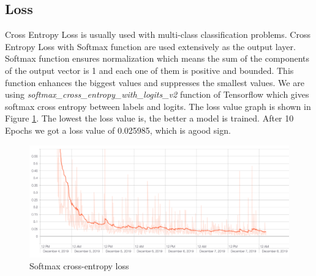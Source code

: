 \subsection{Loss}
Cross Entropy Loss is usually used with multi-class classification problems. Cross Entropy Loss with Softmax function are used extensively as the output layer. Softmax function ensures normalization which means the sum of the components of the output vector is 1 and each one of them is positive and bounded. This function enhances the biggest values and suppresses the smallest values. We are using \textit{softmax\_cross\_entropy\_with\_logits\_v2} function of Tensorflow which gives softmax cross entropy between labels and logits. The loss value graph is shown in Figure \ref{fig:loss}. The lowest the loss value is, the better a model is trained. After 10 Epochs we got a loss value of 0.025985, which is agood sign.
\begin{figure}[H]
  \centering
  \includegraphics[scale=0.40]{images/Chapter5/loss.png}
  \caption{Softmax cross-entropy loss}
  \label{fig:loss}
\end{figure}



